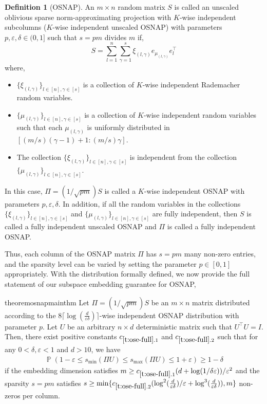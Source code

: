 \documentclass[11pt]{amsart}
\numberwithin{equation}{section}
\numberwithin{equation}{section}
\DeclareMathOperator{\Pb}{\mathbb{P}}
\theoremstyle{remark}
\theoremstyle{definition}
\newtheorem{definition}[theorem]{Definition}
\begin{document}
\begin{definition}[OSNAP]\label{def:osnap} 
An $m \times n$ random matrix $S$ is called an unscaled oblivious sparse norm-approximating projection with $K$-wise independent subcolumns ($K$-wise independent unscaled OSNAP) with parameters $p, \varepsilon, \delta \in (0,1]$ such that $s=pm$ divides $m$ if,
\[ S = \sum_{l=1}^n \sum_{\gamma=1}^s \xi_{(l,\gamma)} e_{\mu_{(l, \gamma)}} e_l ^\top \]
where,
\begin{itemize}
    \item $\{ \xi_{(l,\gamma)} \}_{l \in [n], \gamma \in [s]}$ is a collection of $K$-wise independent Rademacher random variables.
    \item $\{ \mu_{(l,\gamma)} \}_{l \in [n], \gamma \in [s]}$ is a collection of $K$-wise independent random variables such that each $\mu_{(l,\gamma)}$ is uniformly distributed in $[(m/s)(\gamma-1)+1:(m/s)\gamma]$.
    \item The collection $\{ \xi_{(l,\gamma)} \}_{l \in [n], \gamma \in [s]}$ is independent from the collection $\{ \mu_{(l,\gamma)} \}_{l \in [n], \gamma \in [s]}$.
\end{itemize}

In this case, $\Pi = (1/\sqrt{pm})S$ is called a $K$-wise independent OSNAP with parameters $p, \varepsilon, \delta$. In addition, if all the random variables in the collections $\{ \xi_{(l,\gamma)} \}_{l \in [n], \gamma \in [s]}$ and $\{ \mu_{(l,\gamma)} \}_{l \in [n], \gamma \in [s]}$ are fully independent, then $S$ is called a fully independent unscaled OSNAP and $\Pi$ is called a fully independent OSNAP.
\end{definition}



Thus, each column of the OSNAP matrix $\Pi$ has $s = pm$ many non-zero entries, and the sparsity level can be varied by setting the parameter $p \in [0,1]$ appropriately. With the distribution formally defined, we now provide the full statement of our subspace embedding guarantee for OSNAP,

\begin{restatable}{theorem}{osnapmainthm}
\label{t:ose-full}
Let $\Pi = (1/\sqrt{pm})S$ be an $m \times n$ matrix distributed according to the $8 \lceil\log (\frac{d}{\varepsilon \delta})\rceil$-wise independent OSNAP distribution with parameter $p$. Let $U$ be an arbitrary $n \times d$ deterministic matrix such that $U^\top U=I$. Then, there exist positive constants $c_{\ref*{t:ose-full}.1}$ and $c_{\ref*{t:ose-full}.2}$ such that for any $0 < \delta, \varepsilon < 1$ and $d>10$,  we have 
\begin{align*}
\Pb \left( 1 - \varepsilon  \leq s_{\min}(\Pi U)   \leq s_{\max}(\Pi U) \leq 1 + \varepsilon \right) \geq 1-\delta
\end{align*}
if the embedding dimension satisfies $m \ge c_{\ref*{t:ose-full}.1}  (d + \log(1/\delta\varepsilon))/\varepsilon^2$ and the sparsity $s=pm$ satisfies $s \ge \min\{c_{\ref*{t:ose-full}.2} (\log ^2(\frac{d}{\varepsilon\delta})/\varepsilon+\log^3(\frac{d}{\varepsilon\delta})),m\}$ non-zeros per column.
\end{restatable}
\end{document}
